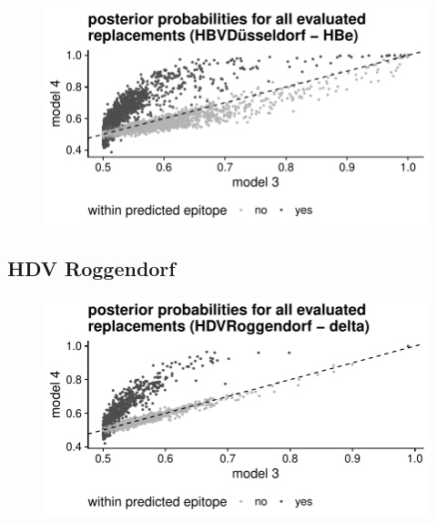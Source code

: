 \documentclass[a4paper,11pt]{article}
\begin{document}
\begin{figure}[H]
    \begin{minipage}{.49\textwidth}
      \includegraphics[width=\linewidth]{plots/posterior_p/hbv_duesseldorf/HBe.pdf}
    \end{minipage}%
    \begin{minipage}{.49\textwidth}
    \end{minipage}
  
    \vspace{0.5cm}
  
    \begin{minipage}{.49\textwidth}
    \end{minipage}
    \begin{minipage}{.49\textwidth}
    \end{minipage}
\end{figure}

\FloatBarrier
\subsection*{HDV Roggendorf}

\begin{figure}[H]
    \begin{minipage}{.49\textwidth}
      \includegraphics[width=\linewidth]{plots/posterior_p/hdv_roggendorf/delta.pdf}
    \end{minipage}%
    \begin{minipage}{.49\textwidth}
    \end{minipage}
\end{figure}
\end{document}
